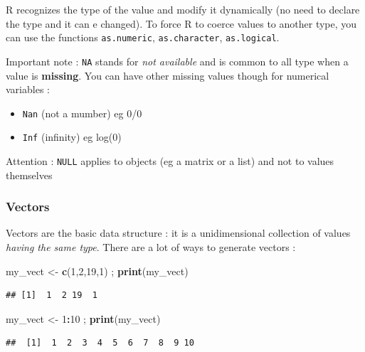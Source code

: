 \documentclass[
]{book}
\newenvironment{Shaded}{\begin{snugshade}}{\end{snugshade}}
\newcommand{\DecValTok}[1]{\textcolor[rgb]{0.00,0.00,0.81}{#1}}
\newcommand{\KeywordTok}[1]{\textcolor[rgb]{0.13,0.29,0.53}{\textbf{#1}}}
\newcommand{\NormalTok}[1]{#1}
\newcommand{\OperatorTok}[1]{\textcolor[rgb]{0.81,0.36,0.00}{\textbf{#1}}}
\newcommand{\StringTok}[1]{\textcolor[rgb]{0.31,0.60,0.02}{#1}}
\providecommand{\tightlist}{%
  \setlength{\itemsep}{0pt}\setlength{\parskip}{0pt}}
\begin{document}
R recognizes the type of the value and modify it dynamically (no need to declare the type and it can e changed). To force R to coerce values to another type, you can use the functions \texttt{as.numeric}, \texttt{as.character}, \texttt{as.logical}.

Important note : \texttt{NA} stands for \emph{not available} and is common to all type when a value is \textbf{missing}. You can have other missing values though for numerical variables :

\begin{itemize}
\tightlist
\item
  \texttt{Nan} (not a mumber) eg 0/0
\item
  \texttt{Inf} (infinity) eg log(0)
\end{itemize}

Attention : \texttt{NULL} applies to objects (eg a matrix or a list) and not to values themselves

\hypertarget{vectors}{%
\subsubsection{Vectors}\label{vectors}}

Vectors are the basic data structure : it is a unidimensional collection of values \emph{having the same type}. There are a lot of ways to generate vectors :

\begin{Shaded}
\begin{Highlighting}[]
\NormalTok{my_vect <-}\StringTok{ }\KeywordTok{c}\NormalTok{(}\DecValTok{1}\NormalTok{,}\DecValTok{2}\NormalTok{,}\DecValTok{19}\NormalTok{,}\DecValTok{1}\NormalTok{) ; }\KeywordTok{print}\NormalTok{(my_vect)}
\end{Highlighting}
\end{Shaded}

\begin{verbatim}
## [1]  1  2 19  1
\end{verbatim}

\begin{Shaded}
\begin{Highlighting}[]
\NormalTok{my_vect <-}\StringTok{ }\DecValTok{1}\OperatorTok{:}\DecValTok{10}\NormalTok{ ; }\KeywordTok{print}\NormalTok{(my_vect)}
\end{Highlighting}
\end{Shaded}

\begin{verbatim}
##  [1]  1  2  3  4  5  6  7  8  9 10
\end{verbatim}
\end{document}
